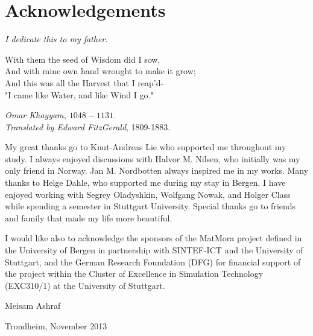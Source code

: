 \chapter{Acknowledgements}

\textit{\small{I dedicate this to my father.}} 

\vspace{1cm}
\hspace{-0.7cm} {\myfont \small With them the seed of Wisdom did I sow,\\
And with mine own hand wrought to make it grow;\\
And this was all the Harvest that I reap'd-\\
"I came like Water, and like Wind I go."}
\vspace{0.3cm}

\hspace{-0.64cm}\small{\textit{Omar Khayyam, $1048-1131$.}}\\
\hspace{0cm} \small{\textit{Translated by Edward FitzGerald}, 1809-1883.}
\vspace{1cm}

My great thanks go to Knut-Andreas Lie who supported me throughout my study. I always enjoyed discussions with Halvor M. Nilsen, who initially was my only friend in Norway. Jan M. Nordbotten always inspired me in my works. Many thanks to Helge Dahle, who supported me during my stay in Bergen. I have enjoyed working with Segrey Oladyshkin, Wolfgang Nowak, and Holger Class while spending a semester in Stuttgart University. Special thanks go to friends and family that made my life more beautiful.

I would like also to acknowledge the sponsors of the MatMora project defined in the University of Bergen in partnership with SINTEF-ICT and the University of Stuttgart, and the German Research Foundation (DFG) for financial support of the project within the Cluster of Excellence in Simulation Technology (EXC310/1) at the University of Stuttgart.


\vspace{2cm}
\hspace{10.72cm}
Meisam Ashraf

\hspace{10cm}
Trondheim, November 2013 








